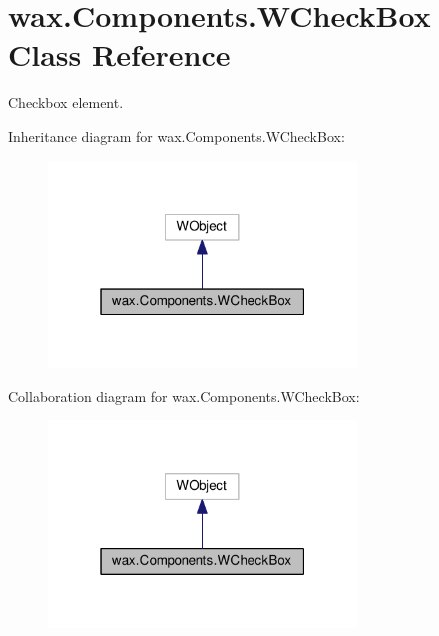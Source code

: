 \hypertarget{classwax_1_1Components_1_1WCheckBox}{}\section{wax.\+Components.\+W\+Check\+Box Class Reference}
\label{classwax_1_1Components_1_1WCheckBox}


Checkbox element.  




Inheritance diagram for wax.\+Components.\+W\+Check\+Box\+:
\nopagebreak
\begin{figure}[H]
\begin{center}
\leavevmode
\includegraphics[width=232pt]{classwax_1_1Components_1_1WCheckBox__inherit__graph}
\end{center}
\end{figure}


Collaboration diagram for wax.\+Components.\+W\+Check\+Box\+:
\nopagebreak
\begin{figure}[H]
\begin{center}
\leavevmode
\includegraphics[width=232pt]{classwax_1_1Components_1_1WCheckBox__coll__graph}
\end{center}
\end{figure}
